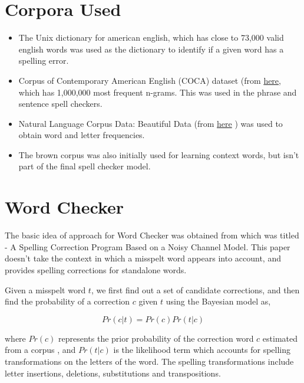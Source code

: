 \section{Corpora Used}
\begin{itemize}
\itemsep1pt\parskip0pt

\item The Unix dictionary for american english, which has close to 73,000 valid english words was used as the dictionary to identify if a given word has a spelling error.

\item Corpus of Contemporary American English (COCA) dataset (from \href{http://www.ngrams.info/download_coca.asp}{here}, which has 1,000,000 most frequent n-grams. This was used in the phrase and sentence spell checkers.	

\item Natural Language Corpus Data: Beautiful Data (from \href{http://norvig.com/ngrams/}{here}
) was used to obtain word and letter frequencies.

\item The brown corpus was also initially used for learning context words, but isn't part of the final spell checker model.

\end{itemize}

\section{Word Checker}
    The basic idea of approach for Word Checker was obtained from \cite{kern} which was titled - A Spelling Correction Program Based on a Noisy Channel Model. This paper doesn't take the context in which a misspelt word appears into account, and provides spelling corrections for standalone words.

Given a misspelt word $t$, we first find out a set of candidate corrections, and then find the  probability of a correction $c$ given $t$ using the Bayesian model as, 

\[Pr(c|t) = Pr(c) Pr(t|c)\]

where $Pr(c)$ represents the prior probability of the correction word $c$ estimated from a corpus , and $Pr(t|c)$ is the likelihood term which accounts for spelling transformations on the letters of the word. The spelling transformations include letter insertions, deletions, substitutions and transpositions.

